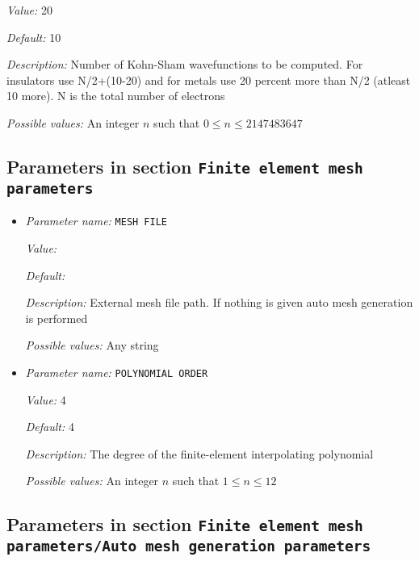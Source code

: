 \begin{itemize}
{\it Value:} 20


{\it Default:} 10


{\it Description:} Number of Kohn-Sham wavefunctions to be computed. For insulators use N/2+(10-20) and for metals use 20 percent more than N/2 (atleast 10 more). N is the total number of electrons


{\it Possible values:} An integer $n$ such that $0\leq n \leq 2147483647$
\end{itemize}

\subsection{Parameters in section \tt Finite element mesh parameters}
\label{parameters:Finite_20element_20mesh_20parameters}

\begin{itemize}
\item {\it Parameter name:} {\tt MESH FILE}
\label{parameters:Finite element mesh parameters/MESH FILE}
\label{parameters:Finite_20element_20mesh_20parameters/MESH_20FILE}


{\it Value:} 


{\it Default:} 


{\it Description:} External mesh file path. If nothing is given auto mesh generation is performed


{\it Possible values:} Any string
\item {\it Parameter name:} {\tt POLYNOMIAL ORDER}
\label{parameters:Finite element mesh parameters/POLYNOMIAL ORDER}
\label{parameters:Finite_20element_20mesh_20parameters/POLYNOMIAL_20ORDER}


{\it Value:} 4


{\it Default:} 4


{\it Description:} The degree of the finite-element interpolating polynomial


{\it Possible values:} An integer $n$ such that $1\leq n \leq 12$
\end{itemize}



\subsection{Parameters in section \tt Finite element mesh parameters/Auto mesh generation parameters}
\label{parameters:Finite_20element_20mesh_20parameters/Auto_20mesh_20generation_20parameters}


